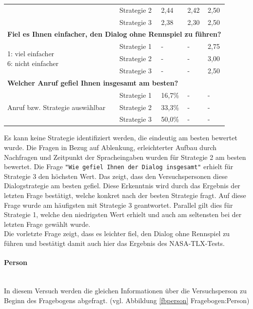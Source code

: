 \documentclass[12pt,a4paper]{scrartcl}
\begin{document}
\begin{longtable}{|p{4cm}|p{2cm}|p{2cm}|p{2cm}|p{2cm}|}
 & Strategie 2 & 2,44 & 2,42 & 2,50 \\
 & Strategie 3 & 2,38 & 2,30 & 2,50 \\
\hline
		\multicolumn{5}{l}{\textbf{Fiel es Ihnen einfacher, den Dialog ohne Rennspiel zu führen?}}\\
		\hline
\multirow{3}{4cm}{1: viel einfacher \newline  6: nicht einfacher} & Strategie 1 & - & - & 2,75 \\
 & Strategie 2 & - & - & 3,00 \\
 & Strategie 3 & - & - & 2,50\\
\hline
		\multicolumn{5}{l}{\textbf{Welcher Anruf gefiel Ihnen insgesamt am besten?}}\\
		\hline
\multirow{3}{4cm}{Anruf bzw. Strategie auswählbar} & Strategie 1 & 16,7\% &-  &-  \\
 & Strategie 2 & 33,3\% & - & - \\
 & Strategie 3 & 50,0\% & - &  -\\
\hline
\end{longtable}

Es kann keine Strategie identifiziert werden, die eindeutig am besten bewertet wurde. 
Die Fragen in Bezug auf Ablenkung, erleichterter Aufbau durch Nachfragen und Zeitpunkt der Spracheingaben wurden für Strategie 2 am besten bewertet.
Die Frage \texttt{"Wie gefiel Ihnen der Dialog insgesamt"} erhielt für Strategie 3 den höchsten Wert. Das zeigt, dass den Versuchspersonen diese Dialogstrategie am besten gefiel. Diese Erkenntnis wird durch das Ergebnis der letzten Frage bestätigt, welche konkret nach der besten Strategie fragt. Auf diese Frage wurde am häufigsten mit Strategie 3 geantwortet. Parallel gilt dies für Strategie 1, welche den niedrigsten Wert erhielt und auch am seltensten bei der letzten Frage gewählt wurde. \\

Die vorletzte Frage zeigt, dass es leichter fiel, den Dialog ohne Rennspiel zu führen und bestätigt damit auch hier das Ergebnis des NASA-TLX-Tests.

\paragraph{Person}
\label{fbperson2}
~\\
In diesem Versuch werden die gleichen Informationen über die Versuchsperson zu Beginn des Fragebogens abgefragt. (vgl. Abbildung \ref{fbperson}  Fragebogen:Person)\\
\end{document}
